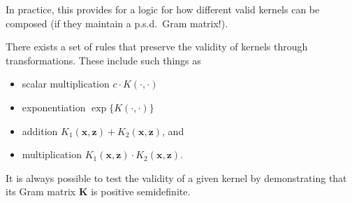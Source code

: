 
In practice,  this provides for a logic for how different valid kernels can be composed (if they maintain a p.s.d.~Gram matrix!). 
%

There exists a set of rules that preserve the validity of kernels through transformations. These include such things as
%
\begin{itemize}
\item scalar multiplication $c \cdot K(\cdot,\cdot)$
\item exponentiation $\exp\{K(\cdot,\cdot)\}$
\item addition $K_{1}(\textbf{x}, \textbf{z}) + K_{2}(\textbf{x}, \textbf{z})$, and
\item multiplication $K_{1}(\textbf{x}, \textbf{z}) \cdot K_{2}(\textbf{x}, \textbf{z})$.
\end{itemize}

It is always possible to test the validity of a given kernel by demonstrating that its Gram matrix $\textbf{K}$ is positive semidefinite.
